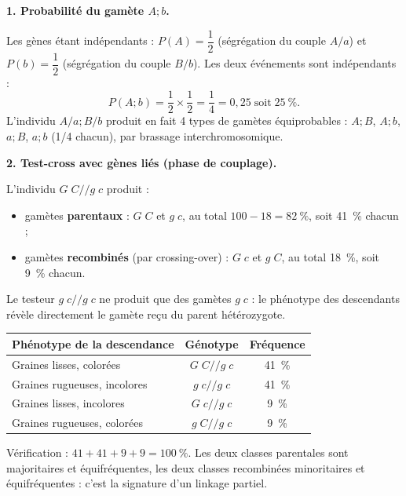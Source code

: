 \documentclass[11pt]{article}
\newcommand{\cle}[1]{{\popxbold\color{popdark}#1}}
\begin{document}
\begin{corrige}
\textbf{1. Probabilité du gamète $A ; b$.}

Les gènes étant indépendants : $P(A) = \dfrac{1}{2}$ (ségrégation du couple $A/a$) et $P(b) = \dfrac{1}{2}$ (ségrégation du couple $B/b$). Les deux événements sont indépendants :
\[ P(A ; b) = \frac{1}{2} \times \frac{1}{2} = \frac{1}{4} = 0,25 \; \text{soit} \; \SI{25}{\percent}. \]
L'individu $A/a ; B/b$ produit en fait 4 types de gamètes équiprobables : $A;B$, $A;b$, $a;B$, $a;b$ (1/4 chacun), par brassage interchromosomique.

\textbf{2. Test-cross avec gènes liés (phase de couplage).}

L'individu $G\;C // g\;c$ produit :
\begin{itemize}
    \item gamètes \textbf{parentaux} : $G\;C$ et $g\;c$, au total $100 - 18 = \SI{82}{\percent}$, soit \SI{41}{\percent} chacun ;
    \item gamètes \textbf{recombinés} (par crossing-over) : $G\;c$ et $g\;C$, au total \SI{18}{\percent}, soit \SI{9}{\percent} chacun.
\end{itemize}
Le testeur $g\;c // g\;c$ ne produit que des gamètes $g\;c$ : le phénotype des descendants révèle directement le gamète reçu du parent hétérozygote.

\begin{center}
\begin{tabular}{|l|c|c|}\hline
\rowcolor{popblueL} Phénotype de la descendance & Génotype & Fréquence \\ \hline
Graines lisses, colorées & $G\;C // g\;c$ & \SI{41}{\percent} \\
Graines rugueuses, incolores & $g\;c // g\;c$ & \SI{41}{\percent} \\
Graines lisses, incolores & $G\;c // g\;c$ & \SI{9}{\percent} \\
Graines rugueuses, colorées & $g\;C // g\;c$ & \SI{9}{\percent} \\ \hline
\end{tabular}
\end{center}

Vérification : $41 + 41 + 9 + 9 = \SI{100}{\percent}$. Les deux classes parentales sont majoritaires et équifréquentes, les deux classes recombinées minoritaires et équifréquentes : c'est la signature d'un \cle{linkage partiel}.
\end{corrige}
\end{document}
